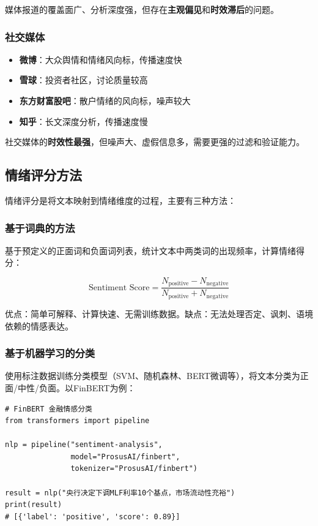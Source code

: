 媒体报道的覆盖面广、分析深度强，但存在\textbf{主观偏见}和\textbf{时效滞后}的问题。

\subsubsection{社交媒体}

\begin{itemize}[leftmargin=2em]
  \item \textbf{微博}：大众舆情和情绪风向标，传播速度快
  \item \textbf{雪球}：投资者社区，讨论质量较高
  \item \textbf{东方财富股吧}：散户情绪的风向标，噪声较大
  \item \textbf{知乎}：长文深度分析，传播速度慢
\end{itemize}

社交媒体的\textbf{时效性最强}，但噪声大、虚假信息多，需要更强的过滤和验证能力。

\subsection{情绪评分方法}

情绪评分是将文本映射到情绪维度的过程，主要有三种方法：

\subsubsection{基于词典的方法}

基于预定义的正面词和负面词列表，统计文本中两类词的出现频率，计算情绪得分：

\[
\text{Sentiment Score} = \frac{N_{\text{positive}} - N_{\text{negative}}}{N_{\text{positive}} + N_{\text{negative}}}
\]

优点：简单可解释、计算快速、无需训练数据。缺点：无法处理否定、讽刺、语境依赖的情感表达。

\subsubsection{基于机器学习的分类}

使用标注数据训练分类模型（SVM、随机森林、BERT微调等），将文本分类为正面/中性/负面。以FinBERT为例：

\begin{lstlisting}[style=python]
# FinBERT 金融情感分类
from transformers import pipeline

nlp = pipeline("sentiment-analysis",
               model="ProsusAI/finbert",
               tokenizer="ProsusAI/finbert")

result = nlp("央行决定下调MLF利率10个基点，市场流动性充裕")
print(result)
# [{'label': 'positive', 'score': 0.89}]
\end{lstlisting}

